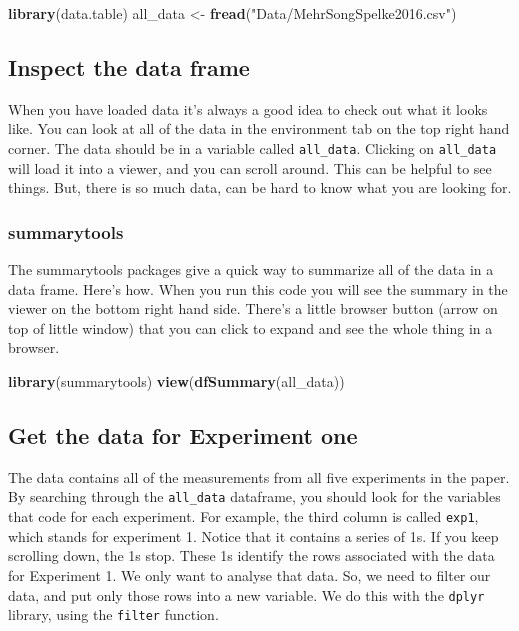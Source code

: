\documentclass[]{book}
\newenvironment{Shaded}{\begin{snugshade}}{\end{snugshade}}
\newcommand{\KeywordTok}[1]{\textcolor[rgb]{0.13,0.29,0.53}{\textbf{{#1}}}}
\newcommand{\StringTok}[1]{\textcolor[rgb]{0.31,0.60,0.02}{{#1}}}
\newcommand{\NormalTok}[1]{{#1}}
\theoremstyle{definition}
\theoremstyle{definition}
\theoremstyle{definition}
\theoremstyle{remark}
\begin{document}
\begin{Shaded}
\begin{Highlighting}[]
\KeywordTok{library}\NormalTok{(data.table)}
\NormalTok{all_data <-}\StringTok{ }\KeywordTok{fread}\NormalTok{(}\StringTok{"Data/MehrSongSpelke2016.csv"}\NormalTok{)}
\end{Highlighting}
\end{Shaded}

\subsection{Inspect the data frame}\label{inspect-the-data-frame}

When you have loaded data it's always a good idea to check out what it
looks like. You can look at all of the data in the environment tab on
the top right hand corner. The data should be in a variable called
\texttt{all\_data}. Clicking on \texttt{all\_data} will load it into a
viewer, and you can scroll around. This can be helpful to see things.
But, there is so much data, can be hard to know what you are looking
for.

\subsubsection{summarytools}\label{summarytools-1}

The summarytools packages give a quick way to summarize all of the data
in a data frame. Here's how. When you run this code you will see the
summary in the viewer on the bottom right hand side. There's a little
browser button (arrow on top of little window) that you can click to
expand and see the whole thing in a browser.

\begin{Shaded}
\begin{Highlighting}[]
\KeywordTok{library}\NormalTok{(summarytools)}
\KeywordTok{view}\NormalTok{(}\KeywordTok{dfSummary}\NormalTok{(all_data))}
\end{Highlighting}
\end{Shaded}

\subsection{Get the data for Experiment
one}\label{get-the-data-for-experiment-one}

The data contains all of the measurements from all five experiments in
the paper. By searching through the \texttt{all\_data} dataframe, you
should look for the variables that code for each experiment. For
example, the third column is called \texttt{exp1}, which stands for
experiment 1. Notice that it contains a series of 1s. If you keep
scrolling down, the 1s stop. These 1s identify the rows associated with
the data for Experiment 1. We only want to analyse that data. So, we
need to filter our data, and put only those rows into a new variable. We
do this with the \texttt{dplyr} library, using the \texttt{filter}
function.
\end{document}

